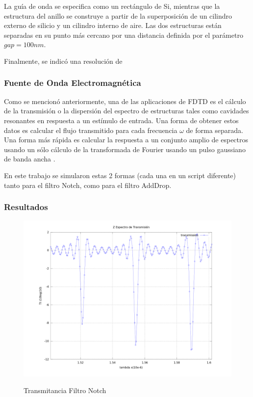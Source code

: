 La guía de onda se especifica como un rectángulo de Si, mientras que la estructura del anillo se construye a partir de la superposición de un cilindro externo de silicio y un cilindro interno de aire. 
Las dos estructuras están separadas en su punto más cercano por una distancia 
definida por el parámetro $gap = 100nm$.

Finalmente, se indicó una resolución de 

\subsubsection{Fuente de Onda Electromagnética} 
Como se mencionó anteriormente, una de las aplicaciones de FDTD es el cálculo 
de la transmisión o la dispersión del espectro de estructuras tales como cavidades 
resonantes en respuesta a un estímulo de entrada. Una forma de obtener estos 
datos es calcular el flujo transmitido para cada frecuencia $\omega$ de forma 
separada. Una forma más rápida es calcular la respuesta a un conjunto 
amplio de espectros usando un sólo cálculo de la transformada de Fourier usando un 
pulso gaussiano de banda ancha \cite{MIT_intro}. 

En este trabajo se simularon estas 2 formas (cada una en un script diferente)
tanto para el filtro Notch, como para el filtro AddDrop.


\subsubsection{Resultados}

\begin{figure}[h!]
\caption{Transmitancia Filtro Notch}
\centering
\includegraphics[width=1.0\textwidth,natwidth=1200,natheight=900]{figs/gausrc_flux_mod-graph_res80.png}
\label{fig:meep_res_n}
\end{figure}

